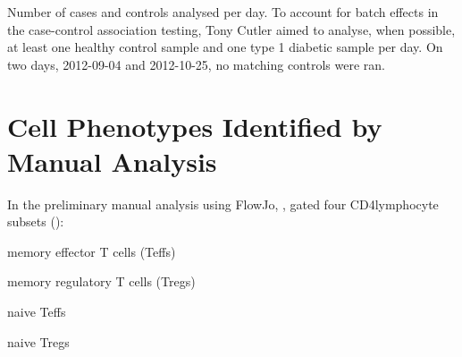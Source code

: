 { Number of cases and controls analysed per day. }
{
  To account for batch effects in the case-control association testing,
  Tony Cutler aimed to analyse, when possible,
  at least one healthy control sample and one type 1 diabetic sample per day.
  On two days, 2012-09-04 and 2012-10-25, no matching controls were ran.
}


\section{Cell Phenotypes Identified by Manual Analysis}

In the preliminary manual analysis using FlowJo, ,
gated four CD4\positive lymphocyte subsets ():
\begin{itemise}
    \item memory effector T cells (Teffs)
    \item memory regulatory T cells (Tregs)
    \item naive Teffs
    \item naive Tregs
\end{itemise}

